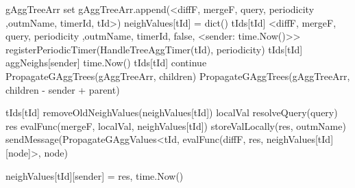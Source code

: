 \begin{algorithm}
\begin{algorithmic}[1]
     \label{alg:mon:global_agg:propag_recv}
        \State gAggTreeArr \asdassign set 
             \label{alg:mon:global_agg:propag_recv_merge}
                \State gAggTreeArr.append(<diffF, mergeF, query, periodicity ,outmName, timerId, tId>)
                \State neighValues[tId] = dict()
                \State tIds[tId] \asdassign <diffF, mergeF, query, periodicity ,outmName, timerId, false, <sender: time.Now()>>
                \State registerPeriodicTimer(HandleTreeAggTimer(tId), periodicity)
            \Else \label{alg:mon:global_agg:propag_recv_merge_end}
                \State <diffF, mergeF, query, periodicity ,outmName, timerId, isLocal, aggNeighs> \asdassign tIds[tId]
                \State aggNeighs[sender] \asdassign time.Now()
                \State tIds[tId] \asdassign <diffF, mergeF, query, periodicity ,outmName, timerId, isLocal, aggNeighs>
                    \State continue
                \EndIf
            \EndIf
        \EndFor
            \State PropagateGAggTrees(gAggTreeArr, children)
        \EndIf
            \State PropagateGAggTrees(gAggTreeArr, children - sender + parent)
        \EndIf
    \asdend


     \label{alg:mon:global_agg:export_trigger}
        \State <diffF, mergeF, query, periodicity, outmName, timerId, isLocal, aggNeighs> \asdassign tIds[tId] \label{alg:mon:global_agg:export_trigger_init_part}
        \State removeOldNeighValues(neighValues[tId])
        \State localVal \asdassign resolveQuery(query)
        \State res \asdassign evalFunc(mergeF, localVal, neighValues[tId])
            \State storeValLocally(res, outmName)
        \EndIf  \label{alg:mon:global_agg:export_trigger_init_part_end}
        \label{alg:mon:global_agg:export_trigger_last_part}
            \State sendMessage(PropagateGAggValues<tId, evalFunc(diffF, res, neighValues[tId][node]>, node)
           
        \EndFor \label{alg:mon:global_agg:export_trigger_last_part_end}
    \asdend

     \label{alg:mon:global_agg:recv_propag_vals}
            \State neighValues[tId][sender] = res, time.Now()
        \EndIf
    \asdend


\end{algorithmic}
\end{algorithm}
